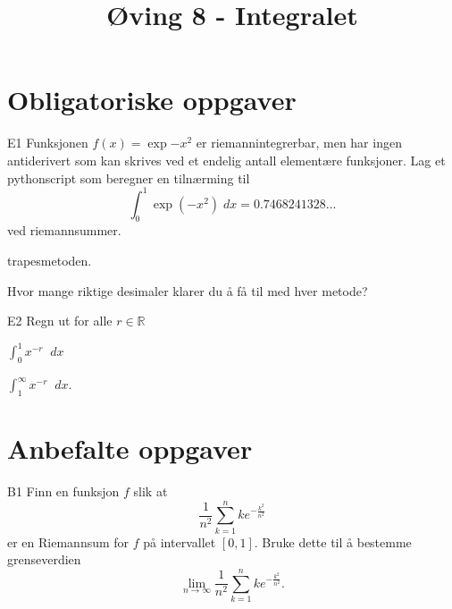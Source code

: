 \documentclass[a4paper,norsk,11pt]{interaktiv}
\title{Øving 8 - Integralet}
\newcommand{\dee}{\mathop{}\!{d}}
\begin{document}

\maketitle


\section*{Obligatoriske oppgaver}


\begin{oppgave}{E1}
Funksjonen $f(x)=\exp{-x^2}$ er riemannintegrerbar, 
men har ingen antiderivert som kan skrives ved et endelig antall elementære funksjoner.
Lag et pythonscript som beregner en tilnærming til 
 \[
\int_0^1\exp{(-x^2)}\;dx=0.7468241328...
 \]
 ved  
  \bPunkt
  riemannsummer.  
   \ePunkt
   
     \bPunkt
 trapesmetoden. 
   \ePunkt
   
 Hvor mange riktige desimaler klarer du å få til med hver metode?
\end{oppgave}

\setcounter{Punkt}{0}

\begin{oppgave}{E2}
 Regn ut for alle $r\in \mathbb R$
  
  \bPunkt
    $\displaystyle\int_0^1 x^{-r} \dee x$
  \ePunkt

  \bPunkt
    $\displaystyle\int_1^\infty x^{-r} \dee x$.
  \ePunkt
\end{oppgave}






\section*{Anbefalte oppgaver}

\begin{oppgave}{B1}
  Finn en funksjon $f$ slik at
  \begin{equation*}
    \frac{1}{n^2} \sum_{k=1}^n k e^{- \frac{k^2}{n^2}}
  \end{equation*}
  er en Riemannsum for $f$ på intervallet $[0,1]$. Bruke dette til å
  bestemme grenseverdien
  \begin{equation*}
    \lim_{n \to \infty} \frac{1}{n^2} \sum_{k=1}^n k e^{-
      \frac{k^2}{n^2}}.
  \end{equation*}
\end{oppgave}
\end{document}

